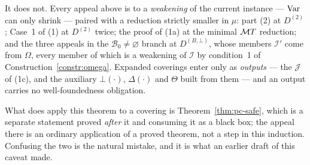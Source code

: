 \begin{hazard}
\begin{enumerate}
  It does not. Every appeal above is to a \emph{weakening} of the current
  instance --- $\operatorname{Var}$ can only shrink --- paired with a reduction strictly
  smaller in $\mu$: part (2) at $D^{(2)}$; Case~1 of (1) at $D^{(2)}$ twice;
  the proof of (1a) at the minimal $\mathcal MT$ reduction; and the three appeals in
  the $\mathcal B_{0}\neq\varnothing$ branch at $D^{(B,\bot)}$, whose members
  $\mathcal I'$ come from $\Omega$, every member of which is a weakening of
  $\mathcal I$ by condition~1 of Construction~\ref{constr:omega}. Expanded
  coverings enter only as \emph{outputs} --- the $\mathcal J$ of (1c), and the
  auxiliary $\bot(\cdot)$, $\Delta(\cdot)$ and $\Theta$ built from them --- and
  an output carries no well-foundedness obligation.

  What does apply this theorem to a covering is
  Theorem~\ref{thm:pc-safe}, which is a separate statement proved
  \emph{after} it and consuming it as a black box; the appeal there is an
  ordinary application of a proved theorem, not a step in this induction.
  Confusing the two is the natural mistake, and it is what an earlier draft of
  this caveat made.
\end{enumerate}
\end{hazard}

